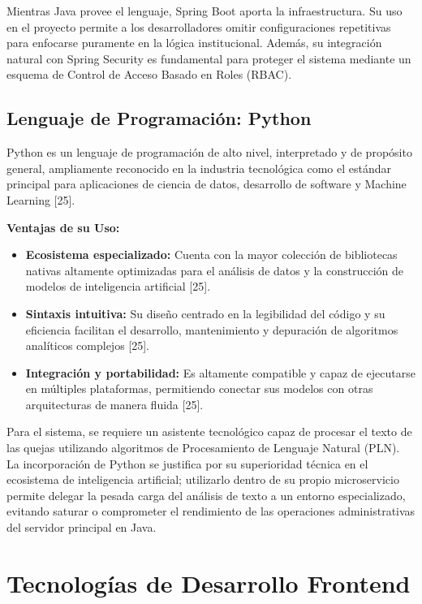 Mientras Java provee el lenguaje, Spring Boot aporta la infraestructura. Su uso en el proyecto permite a los desarrolladores omitir configuraciones repetitivas para enfocarse puramente en la lógica institucional. Además, su integración natural con Spring Security es fundamental para proteger el sistema mediante un esquema de Control de Acceso Basado en Roles (RBAC).

\subsection{Lenguaje de Programación: Python}
Python es un lenguaje de programación de alto nivel, interpretado y de propósito general, ampliamente reconocido en la industria tecnológica como el estándar principal para aplicaciones de ciencia de datos, desarrollo de software y Machine Learning [25].

\textbf{Ventajas de su Uso:}
\begin{itemize}
    \item \textbf{Ecosistema especializado:} Cuenta con la mayor colección de bibliotecas nativas altamente optimizadas para el análisis de datos y la construcción de modelos de inteligencia artificial [25].
    \item \textbf{Sintaxis intuitiva:} Su diseño centrado en la legibilidad del código y su eficiencia facilitan el desarrollo, mantenimiento y depuración de algoritmos analíticos complejos [25].
    \item \textbf{Integración y portabilidad:} Es altamente compatible y capaz de ejecutarse en múltiples plataformas, permitiendo conectar sus modelos con otras arquitecturas de manera fluida [25].
\end{itemize}

Para el sistema, se requiere un asistente tecnológico capaz de procesar el texto de las quejas utilizando algoritmos de Procesamiento de Lenguaje Natural (PLN). La incorporación de Python se justifica por su superioridad técnica en el ecosistema de inteligencia artificial; utilizarlo dentro de su propio microservicio permite delegar la pesada carga del análisis de texto a un entorno especializado, evitando saturar o comprometer el rendimiento de las operaciones administrativas del servidor principal en Java.
\section{Tecnologías de Desarrollo Frontend}
